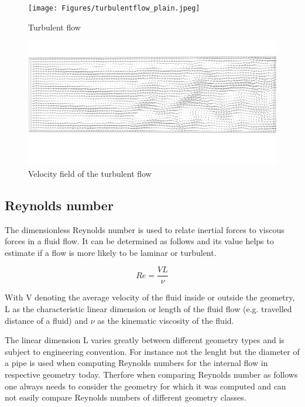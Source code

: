 \begin{figure}[htp]
\centering
\texttt{[image: Figures/turbulentflow\_plain.jpeg]}
\caption{Turbulent flow}
\label{fig:TurbulentFlowPlain}
\end{figure}



\begin{figure}[htp]
\centering
\includegraphics[scale=0.05]{Figures/turbulentflow_vectors.png}
\caption{Velocity field of the turbulent flow}
\label{fig:TurbulentFlowVector}
\end{figure}

\subsection{Reynolds number}

The dimensionless Reynolds number is used to relate inertial forces to viscous forces in a fluid flow. It can be determined as follows and its value helps to estimate if a flow is more likely to be laminar or turbulent. 


\[
Re = 
\frac {VL}{\nu} 
\]


With V denoting the average velocity of the fluid inside or outside the geometry, L
as the characteristic linear dimension or length of the fluid flow (e.g. travelled distance of a fluid) and \(\nu\) as the kinematic viscosity of the fluid.

The linear dimension L varies greatly between different geometry types and is subject to engineering convention. For instance not the lenght but the diameter of a pipe is used when computing Reynolds numbers for the internal flow in respective geometry today. Therfore when comparing Reynolds number as follows one always needs to consider the geometry for which it was computed and can not easily compare Reynolds numbers of different geometry classes.

